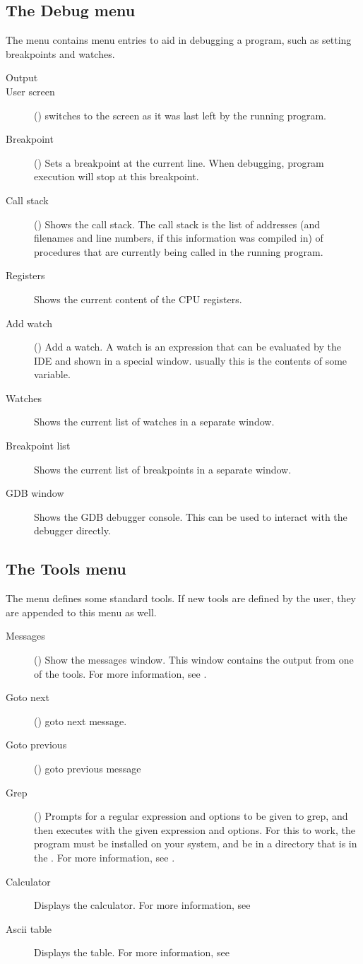 \subsection{The Debug menu}
\label{se:menudebug}
The  menu contains menu entries to aid in debugging a program, such as
setting breakpoints and watches. 
\begin{description}
\item[Output]
\item[User screen] () switches to the screen as it was last
left by the running program.
\item[Breakpoint] ()
Sets a breakpoint at the current line. When debugging, program execution
will stop at this breakpoint.
\item[Call stack] ()
Shows the call stack. The call stack is the list of addresses (and
filenames and line numbers, if this information was compiled in) of 
procedures that are currently being called in the running program.
\item[Registers]
Shows the current content of the CPU registers. 
\item[Add watch] () Add a watch. A watch is an expression
that can be evaluated by the IDE and shown in a special window. usually this
is the contents of some variable. 
\item[Watches]
Shows the current list of watches in a separate window.
\item[Breakpoint list]
Shows the current list of breakpoints in a separate window.
\item[GDB window]
Shows the GDB debugger console. This can be used to interact with the debugger
directly.
\end{description}
%
%
\subsection{The Tools menu}
\label{se:menutools}
The  menu defines some standard tools. If new tools are defined by the
user, they are appended to this menu as well.
\begin{description}
\item[Messages] () Show the messages window. 
This window contains the output from one of the tools. For more information,
see .
\item[Goto next] () goto next message.
\item[Goto previous] () goto previous message
\item[Grep] () Prompts for a regular expression and options
to be given to grep, and then executes  with the given expression and
options. For this to work, the  program must be installed on your
system, and be in a directory that is in the . For more
information, see .
\item[Calculator] 
Displays the calculator. For more information, see 
\item[Ascii table] Displays the  table. For more information, see
\end{description}
%
%
